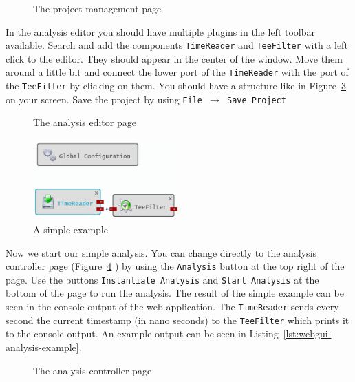 			\begin{figure}[h!]
				\caption{The project management page}
				\label{fig:webgui-project-management-page}
			\end{figure}

			\noindent
			In the analysis editor you should have multiple plugins in the left toolbar available. Search and add the components \texttt{TimeReader} and \texttt{TeeFilter} with a left click to the editor. They should appear in the center of the window. Move them around a little bit and connect the lower port of the \texttt{TimeReader} with the port of the \texttt{TeeFilter} by clicking on them. You should have a structure like in Figure~\ref{fig:webgui-analysis-example} on your screen. Save the project by using \texttt{File $\to$ Save Project}
		
			\begin{figure}[h!]
				\caption{The analysis editor page}
				\label{fig:webgui-analysis-editor-page}
			\end{figure}
			
			\begin{figure}[h!]
				\center
				\includegraphics[width = 0.5\textwidth]{images/kieker-webgui-example.png}
				
				\caption{A simple example}
				\label{fig:webgui-analysis-example}
			\end{figure}
			
			\noindent
			Now we start our simple analysis. You can change directly to the analysis controller page (Figure~\ref{fig:webgui-analysis-controller-page} ) by using the \texttt{Analysis} button at the top right of the page. Use the buttons \texttt{Instantiate Analysis} and \texttt{Start Analysis} at the bottom of the page to run the analysis. The result of the simple example can be seen in the console output of the web application. The \texttt{TimeReader} sends every second the current timestamp (in nano seconds) to the \texttt{TeeFilter} which prints it to the console output. An example output can be seen in Listing~\ref{lst:webgui-analysis-example}.
			
			
			\begin{figure}[h!]
				\caption{The analysis controller page}
				\label{fig:webgui-analysis-controller-page}
			\end{figure}
			
